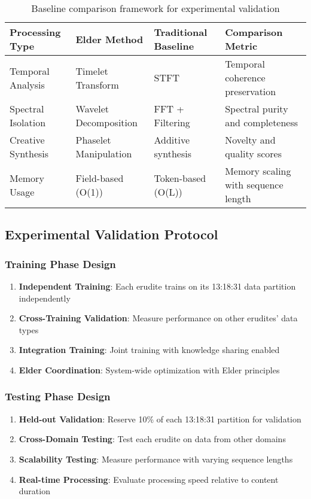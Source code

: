 \begin{table}[h]
\centering
\begin{tabular}{|l|l|l|l|}
\hline
\textbf{Processing Type} & \textbf{Elder Method} & \textbf{Traditional Baseline} & \textbf{Comparison Metric} \\
\hline
Temporal Analysis & Timelet Transform & STFT & Temporal coherence preservation \\
\hline
Spectral Isolation & Wavelet Decomposition & FFT + Filtering & Spectral purity and completeness \\
\hline
Creative Synthesis & Phaselet Manipulation & Additive synthesis & Novelty and quality scores \\
\hline
Memory Usage & Field-based (O(1)) & Token-based (O(L)) & Memory scaling with sequence length \\
\hline
\end{tabular}
\caption{Baseline comparison framework for experimental validation}
\end{table}

\subsection{Experimental Validation Protocol}

\subsubsection{Training Phase Design}

\begin{enumerate}
    \item \textbf{Independent Training}: Each erudite trains on its 13:18:31 data partition independently
    \item \textbf{Cross-Training Validation}: Measure performance on other erudites' data types
    \item \textbf{Integration Training}: Joint training with knowledge sharing enabled
    \item \textbf{Elder Coordination}: System-wide optimization with Elder principles
\end{enumerate}

\subsubsection{Testing Phase Design}

\begin{enumerate}
    \item \textbf{Held-out Validation}: Reserve 10\% of each 13:18:31 partition for validation
    \item \textbf{Cross-Domain Testing}: Test each erudite on data from other domains
    \item \textbf{Scalability Testing}: Measure performance with varying sequence lengths
    \item \textbf{Real-time Processing}: Evaluate processing speed relative to content duration
\end{enumerate}

